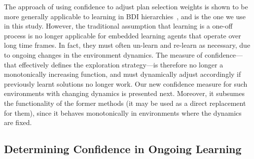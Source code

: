 The approach of using confidence to adjust plan selection weights is shown to be more generally applicable to learning in BDI hierarchies~\cite{singh10:extending,singh10:learning}, and is the one we use in this study. However, the traditional assumption that learning is a one-off process is no longer applicable for embedded learning agents that operate over long time frames. In fact, they must often un-learn and re-learn as necessary, due to ongoing changes in the environment dynamics. The measure of confidence---that effectively defines the exploration strategy---is therefore no longer a monotonically increasing function, and must dynamically adjust accordingly if previously learnt solutions no longer work. Our new confidence measure for such environments with changing dynamics is presented next. Moreover, it subsumes the functionality of the former methods (it may be used as a direct replacement for them), since it behaves monotonically in environments where the dynamics are fixed. 

\subsection{Determining Confidence in Ongoing Learning}\label{sec:confidence}

\newcommand{\ds}{\zeta}
\newcommand{\app}{\mathname{app}}
\newcommand{\stable}{\mathname{stable}}



